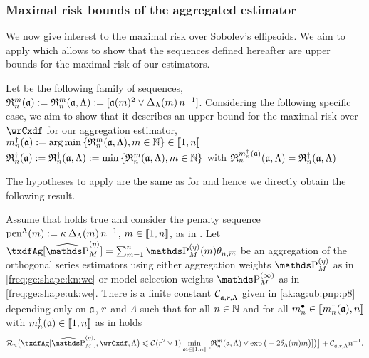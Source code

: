 \subsubsection{Maximal risk bounds of the aggregated estimator}
We now give interest to the maximal risk over Sobolev's ellipsoids.
We aim to apply  which allows to show that the sequences defined hereafter are upper bounds for the maximal risk of our estimators.
\begin{de*}
  Let be the following family of sequences,
  $\daRa{\Di}{(\xdfCw[])}:=\daRa{\Di}{(\xdfCw[],\Lambda)}:=[\xdfCw^2\vee \DipenSv\,\ssY^{-1}]$.
Considering the following specific case, we aim to show that it describes an upper bound for the maximal risk over $\rwCxdf$ for our aggregation estimator,
    $\aDi{\ssY}(\xdfCw[]):=\argmin\Nset[\Di\in\Nz]{\daRa{\Di}{(\xdfCw[],\Lambda)}}\in\nset{1,\ssY}$\\
    $\naRa{(\xdfCw[])}:=\naRa{(\xdfCw[],\Lambda)}:=\min\Nset[\Di\in\Nz]{\daRa{\Di}{(\xdfCw[],\Lambda)}}$
    with $\daRa{\aDi{\ssY}(\xdfCw[])}{(\xdfCw[],\Lambda)}=\naRa{(\xdfCw[],\Lambda)}$
\assEnd
\end{de*}

The hypotheses to apply  are the same as for  and hence we directly obtain the following result.

\begin{thm}
Assume that  holds true and consider the penalty sequence $\penSv:=\penD$, $\Di\in\nset{1,n}$, as in .
Let $\txdfAg[{\erWe[]}]=\sum_{\Di=1}^{\ssY} \We\txdfPr$ be an aggregation of the orthogonal series estimators using either aggregation weights $\rWe[]$ as in \eqref{freq:ge:shape:kn:we} or model selection weights $\msWe[]$ as in \eqref{freq:ge:shape:uk:we}. %
There is a finite constant $\cst{\xdfCw[],\xdfCr,\Lambda}$ given in
\eqref{ak:ag:ub:pnp:p8} depending only on $\xdfCw[]$, $\xdfCr$ and $\Lambda$ such that for all
$\ssY\in\Nz$ and for all $\sDi{\ssY}\in\nset{\aDi{\ssY}(\xdfCw[]),\ssY}$  with
 $\aDi{\ssY}(\xdfCw[])\in\nset{1,n}$ as in  holds 
 \begin{equation}
 \nRi{\txdfAg[{\erWe[]}]}{\rwCxdf,\Lambda}
    \leq 
   \cst{}(\xdfCr^2\vee1)\min_{\Di\in\nset{1,\ssY}}\big[\daRa{\Di}{(\xdfCw[],\Lambda)}\vee\exp\big(-2\cmiSv\Di\big)]\big)\big]
   +\cst{\xdfCw[],\xdfCr,\Lambda}\ssY^{-1}.
\end{equation}
\reEnd
\end{thm}

